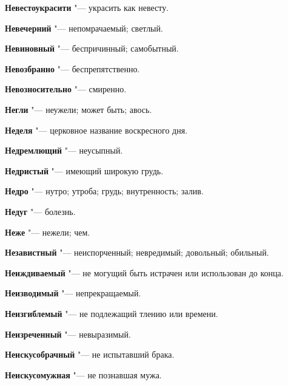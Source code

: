 \begin{mymulticols}{2}
\noindent\textbf{Невестоукрасити} "--- украсить как невесту. 




\noindent\textbf{Невечерний} "--- непомрачаемый; светлый. 




\noindent\textbf{Невиновный} "--- беспричинный; самобытный. 




\noindent\textbf{Невозбранно} "--- беспрепятственно. 




\noindent\textbf{Невозносительно} "--- смиренно. 




\noindent\textbf{Негли} "--- неужели; может быть; авось. 




\noindent\textbf{Неделя} "--- церковное название воскресного дня. 




\noindent\textbf{Недремлющий} "--- неусыпный. 




\noindent\textbf{Недристый} "--- имеющий широкую грудь. 




\noindent\textbf{Недро} "--- нутро; утроба; грудь; внутренность; залив. 




\noindent\textbf{Недуг} "--- болезнь. 




\noindent\textbf{Неже} "--- нежели; чем. 




\noindent\textbf{Независтный} "--- неиспорченный; невредимый; довольный; обильный. 




\noindent\textbf{Неиждиваемый} "--- не могущий быть истрачен или использован до конца. 




\noindent\textbf{Неизводимый} "--- непрекращаемый. 




\noindent\textbf{Неизгиблемый} "--- не подлежащий тлению или времени. 




\noindent\textbf{Неизреченный} "--- невыразимый. 




\noindent\textbf{Неискусобрачный} "--- не испытавший брака. 




\noindent\textbf{Неискусомужная} "--- не познавшая мужа. 





\end{mymulticols}
